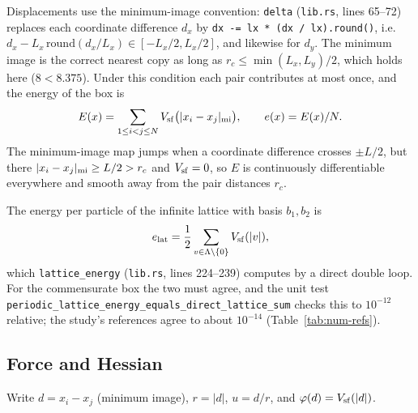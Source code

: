 Displacements use the minimum-image convention: \texttt{delta} (\texttt{lib.rs}, lines 65--72) replaces each coordinate
difference $d_x$ by \texttt{dx -= lx * (dx / lx).round()}, i.e.\ $d_x-L_x\,\mathrm{round}(d_x/L_x)\in[-L_x/2,L_x/2]$, and
likewise for $d_y$. The minimum image is the correct nearest copy as long as $r_c\le\min(L_x,L_y)/2$, which holds here ($8<8.375$). Under
this condition each pair contributes at most once, and the energy of the box is
\begin{equation}\label{eq:Ebox}
E(x)=\sum_{1\le i<j\le N}V_{\rm sf}\bigl(\lvert x_i-x_j\rvert_{\rm mi}\bigr),\qquad e(x)=E(x)/N .
\end{equation}
The minimum-image map jumps when a coordinate difference crosses $\pm L/2$, but there $|x_i-x_j|_{\rm mi}\ge L/2>r_c$
and $V_{\rm sf}=0$, so $E$ is continuously differentiable everywhere and smooth away from the pair distances $r_c$.

The energy per particle of the infinite lattice with basis $b_1,b_2$ is
\begin{equation}\label{eq:elat}
e_{\rm lat}=\frac12\sum_{v\in\Lambda\setminus\{0\}}V_{\rm sf}(|v|),
\end{equation}
which \texttt{lattice\_energy} (\texttt{lib.rs}, lines 224--239) computes by a direct double loop. For the commensurate
box the two must agree, and the unit test \texttt{periodic\_\allowbreak lattice\_\allowbreak energy\_\allowbreak equals\_\allowbreak direct\_\allowbreak lattice\_\allowbreak sum} checks this to
$10^{-12}$ relative; the study's references agree to about $10^{-14}$ (Table~\ref{tab:num-refs}).

\subsection{Force and Hessian}
Write $d=x_i-x_j$ (minimum image), $r=|d|$, $u=d/r$, and $\varphi(d)=V_{\rm sf}(|d|)$.

